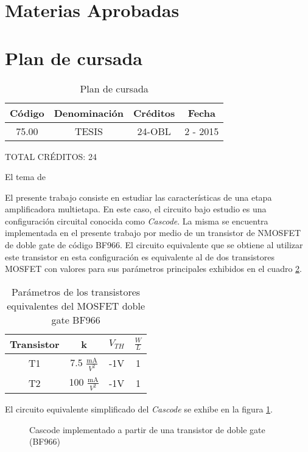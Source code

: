 \documentclass[a4paper,10pt]{article}
\begin{document}
	\newpage
	\section{Materias Aprobadas}	
		
	\newpage
	\section{Plan de cursada}
	
	\begin{table}[!htb]
		\centering
		\begin{tabular}{|c|c|c|c|}
			\hline
			Código & Denominación & Créditos & Fecha \\
			\hline
			75.00 & TESIS & 24-OBL & 2 - 2015 \\
			\hline
		\end{tabular}
		\caption{Plan de cursada} \label{tabPlanCursada}
	\end{table}

	TOTAL CRÉDITOS: 24	
		
		El tema de 
	
	El presente trabajo consiste en estudiar las características de una etapa amplificadora multietapa. En este caso, el circuito bajo estudio es una 
		configuración circuital conocida como \emph{Cascode}. La misma se encuentra implementada en el presente trabajo por medio de un transistor de NMOSFET
		de doble gate de código BF966. El circuito equivalente que se obtiene al utilizar este transistor en esta configuración es equivalente al de 
		dos transistores MOSFET con valores para sus parámetros principales exhibidos en el cuadro \ref{tab001}. 

		\begin{table}[!htb]
			\centering
			\begin{tabular}{|c|c|c|c|}
				\hline
				Transistor & k & $V_{TH}$ & $\frac{W}{L}$ \\
				\hline
				T1 & 7.5 $\frac{\text{mA}}{V^2}$ & -1V & 1 \\
				\hline
				T2 & 100 $\frac{\text{mA}}{V^2}$ & -1V & 1 \\
				\hline
			\end{tabular}
			\caption{Parámetros de los transistores equivalentes del MOSFET doble gate BF966} \label{tab001}
		\end{table}

		El circuito equivalente simplificado del \emph{Cascode} se exhibe en la figura \ref{circ001}. 

		\begin{figure}[!htp]
			\centering
			 
	     \caption{Cascode implementado a partir de una transistor de doble gate (BF966)} \label{circ001}
		 \end{figure}
\end{document}
